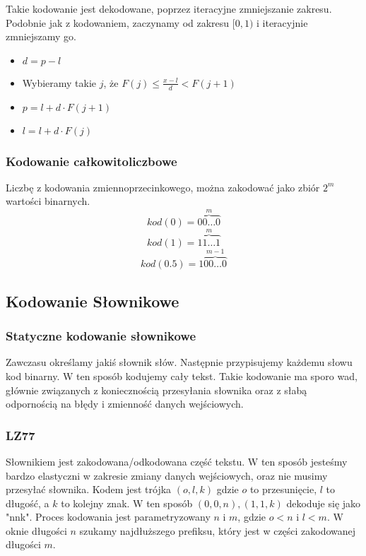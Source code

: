 \documentclass{../notatki}
\begin{document}
Takie kodowanie jest dekodowane, poprzez iteracyjne zmniejszanie zakresu.
Podobnie jak z kodowaniem, zaczynamy od zakresu $[0, 1)$ i iteracyjnie
zmniejszamy go.
\begin{itemize}
  \item $d = p - l$
  \item Wybieramy takie $j$, że $F(j) \leq \frac{x - l}{d} < F(j + 1)$
  \item $p = l + d \cdot F(j + 1)$
  \item $l = l + d \cdot F(j)$
\end{itemize}

\subsubsection{Kodowanie całkowitoliczbowe}

Liczbę z kodowania zmiennoprzecinkowego, można zakodować jako zbiór $2^m$
wartości binarnych.
$$
kod(0) = \stackrel{m}{\overbrace{00 \dots 0}}
$$
$$
kod(1) = \stackrel{m}{\overbrace{11 \dots 1}}
$$
$$
kod(0.5) = 1\stackrel{m-1}{\overbrace{00 \dots 0}}
$$

\subsection{Kodowanie Słownikowe}

\subsubsection{Statyczne kodowanie słownikowe}

Zawczasu określamy jakiś słownik słów. Następnie przypisujemy każdemu słowu
kod binarny. W ten sposób kodujemy cały tekst. Takie kodowanie ma sporo wad,
głównie związanych z koniecznością przesyłania słownika oraz z słabą
odpornością na błędy i zmienność danych wejściowych.

\subsubsection{LZ77}

Słownikiem jest zakodowana/odkodowana część tekstu. W ten sposób
jesteśmy bardzo
elastyczni w zakresie zmiany danych wejściowych, oraz nie musimy przesyłać
słownika. Kodem jest trójka $(o, l, k)$ gdzie $o$ to przesunięcie, $l$ to
długość, a $k$ to kolejny znak. W ten sposób $(0, 0, n),(1, 1, k)$
dekoduje się
jako "nnk". Proces kodowania jest parametryzowany $n$ i $m$, gdzie $o < n$ i
$l < m$. W oknie długości $n$ szukamy najdłuższego prefiksu, który jest
w części zakodowanej długości $m$.
\end{document}

